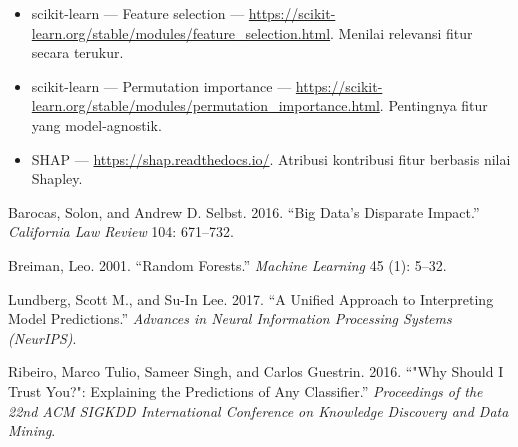 \begin{bacaan}

\begin{itemize}
\tightlist
\item
  scikit-learn --- Feature selection --- \url{https://scikit-learn.org/stable/modules/feature_selection.html}. Menilai relevansi fitur secara terukur.
\item
  scikit-learn --- Permutation importance --- \url{https://scikit-learn.org/stable/modules/permutation_importance.html}. Pentingnya fitur yang model-agnostik.
\item
  SHAP --- \url{https://shap.readthedocs.io/}. Atribusi kontribusi fitur berbasis nilai Shapley.
\end{itemize}

\end{bacaan}

\rujukanheading

\protect{}\label{refs}
\begin{CSLReferences}{1}{1}
Barocas, Solon, and Andrew D. Selbst. 2016. {``Big Data's Disparate Impact.''} \emph{California Law Review} 104: 671--732.

Breiman, Leo. 2001. {``Random Forests.''} \emph{Machine Learning} 45 (1): 5--32.

Lundberg, Scott M., and Su-In Lee. 2017. {``A Unified Approach to Interpreting Model Predictions.''} \emph{Advances in Neural Information Processing Systems (NeurIPS)}.

Ribeiro, Marco Tulio, Sameer Singh, and Carlos Guestrin. 2016. {``"Why Should {I} Trust You?": Explaining the Predictions of Any Classifier.''} \emph{Proceedings of the 22nd ACM SIGKDD International Conference on Knowledge Discovery and Data Mining}.

\end{CSLReferences}
